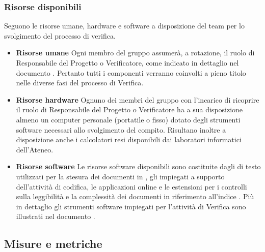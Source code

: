 		\subsubsection{Risorse disponibili}
		Seguono le risorse umane, hardware e software a disposizione del team per lo svolgimento del processo di verifica.
		\begin{itemize}
			\item \textbf{Risorse umane}
			Ogni membro del gruppo assumerà, a rotazione, il ruolo di Responsabile del Progetto o Verificatore, come indicato in dettaglio nel documento \PdP. Pertanto tutti i componenti verranno coinvolti a pieno titolo nelle diverse fasi del processo di Verifica.
			\item \textbf{Risorse hardware}
			Ognuno dei membri del gruppo con l'incarico di ricoprire il ruolo di Responsabile del Progetto o Verificatore ha a sua disposizione almeno un computer personale (portatile o fisso) dotato degli strumenti software necessari allo svolgimento del compito. Risultano inoltre a disposizione anche i calcolatori resi disponibili dai laboratori informatici dell'Ateneo.
			\item \textbf{Risorse software}
			Le risorse software disponibili sono costituite dagli  di testo utilizzati per la stesura dei documenti in , gli  impiegati a supporto dell'attività di codifica, le applicazioni online e le estensioni per i controlli sulla leggibilità e la complessità dei documenti in riferimento all'indice . Più in dettaglio gli strumenti software impiegati per l'attività di Verifica sono illustrati nel documento \NdP.
			\end{itemize}
	\subsection{Misure e metriche \label{S5}}
